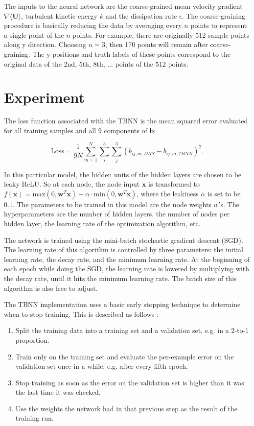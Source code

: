 \documentclass{article}
\numberwithin{equation}{section}
\begin{document}
The inputs to the neural network are the coarse-grained mean velocity gradient $\nabla\langle\mathbf{U}\rangle$, turbulent kinetic energy $k$ and the dissipation rate $\epsilon$. The coarse-graining procedure is basically reducing the data by averaging every $n$ points to represent a single point of the $n$ points. For example, there are originally 512 sample points along y direction. Choosing $n=3$, then 170 points will remain after coarse-graining. The y positions and truth labels of these points correspond to the original data of the 2nd, 5th, 8th, ... points of the 512 points. 

\section{Experiment}

The loss function associated with the TBNN is the mean squared error evaluated for all training samples and all 9 components of $\mathbf{b}$: 

\begin{equation}
    \text{Loss} = \frac{1}{9N}\sum_{m=1}^{N}\sum_i^3\sum_j^3\left(b_{ij,m,DNS}-b_{ij,m,TBNN}\right)^2.
    \label{eqn:loss}
\end{equation}

In this particular model, the hidden units of the hidden layers are chosen to be leaky ReLU. So at each node, the node input $\mathbf{x}$ is transformed to $f(\mathbf{x})=\text{max}(0, \mathbf{w}^T\mathbf{x}) + \alpha\cdot\text{min}(0,\mathbf{w}^T\mathbf{x})$, where the leakiness $\alpha$ is set to be $0.1$. The parameters to be trained in this model are the node weights $w$'s. The hyperparameters are the number of hidden layers, the number of nodes per hidden layer, the learning rate of the optimization algorithm, etc. 

The network is trained using the mini-batch stochastic gradient descent (SGD). The learning rate of this algorithm is controlled by three parameters: the initial learning rate, the decay rate, and the minimum learning rate. At the beginning of each epoch while doing the SGD, the learning rate is lowered by multiplying with the decay rate, until it hits the minimum learning rate. The batch size of this algorithm is also free to adjust.  

The TBNN implementation uses a basic early stopping technique to determine when to stop training. This is described as follows \cite{prechelt1998early}:  
\begin{enumerate}
    \item Split the training data into a training set and a validation set, e.g. in a 2-to-1 proportion.
    \item Train only on the training set and evaluate the per-example error on the validation set once in a while, e.g. after every fifth epoch.
    \item Stop training as soon as the error on the validation set is higher than it was the last time it was checked.
    \item Use the weights the network had in that previous step as the result of the training run.
\end{enumerate}
\end{document}
